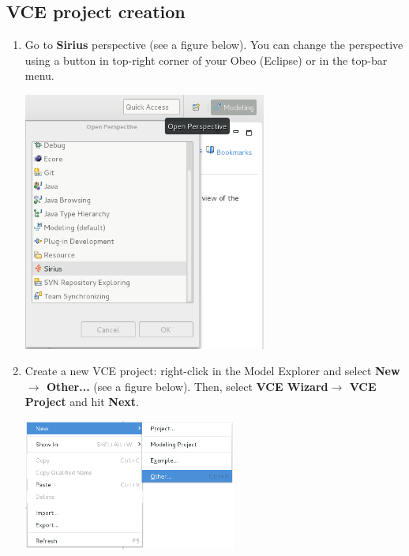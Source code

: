 \documentclass[12pt]{article}
\begin{document}
\subsection{VCE project creation}
\begin{enumerate}
\item
Go to \textbf{Sirius} perspective (see a figure below). You can change the perspective using a button in top-right corner of your Obeo (Eclipse) or in the top-bar menu.
     \centerline{
     \includegraphics[width=8cm]{draws/sirius-persp.png}
     \label{fig:sirius-persp}
     }
\item
Create a new VCE project: right-click in the Model Explorer and select \textbf{New$\rightarrow$ Other...} (see a figure below). Then, select \textbf{VCE Wizard$\rightarrow$ VCE Project} and hit \textbf{Next}.

    \centerline{
     \includegraphics[width=7cm]{draws/new-other.png}
     \label{fig:new-other}
     }
 

\end{enumerate}
\end{document}
